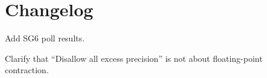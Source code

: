 \section{Changelog}
\begin{revision}
\item Add SG6 poll results.
\item Clarify that “Disallow all excess precision” is not about floating-point contraction.
\end{revision}
